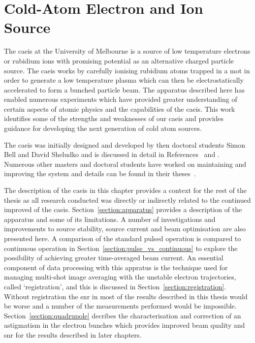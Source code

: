 \chapter{Cold-Atom Electron and Ion Source}\label{chapter:setup}

The \gls{caeis} at the University of Melbourne is a source of low temperature electrons or rubidium ions with promising potential as an alternative charged particle source.
The \gls{caeis} works by carefully ionising rubidium atoms trapped in a \gls{mot} in order to generate a low temperature plasma which can then be electrostatically accelerated to form a bunched particle beam.
The apparatus described here has enabled numerous experiments which have provided greater understanding of certain aspects of atomic physics and the capabilities of the \gls{caeis}.
This work identifies some of the strengths and weaknesses of our \gls{caeis} and provides guidance for developing the next generation of cold atom sources.

The \gls{caeis} was initially designed and developed by then doctoral students Simon Bell and David Sheludko and is discussed in detail in References~\cite{sheludko_shaped_2010} and \cite{bell_cold_2011}.
Numerous other masters and doctoral students have worked on maintaining and improving the system and details can be found in their theses~\cite{saliba_cold_2011,mcculloch_generation_2013,taylor_rydberg_2013,tielen_development_2015,murphy_measurement_2017,speirs_electron_2017}.

The description of the \gls{caeis} in this chapter provides a context for the rest of the thesis as all research conducted was directly or indirectly related to the continued improved of the \gls{caeis}.
Section~\ref{section:apparatus} provides a description of the apparatus and some of its limitations.
A number of investigations and improvements to source stability, source current and beam optimisation are also presented here.
A comparison of the standard pulsed operation is compared to continuous operation in Section~\ref{section:pulse_vs_continuous} to explore the possibility of achieving greater time-averaged beam current.
An essential component of data processing with this appratus is the technique used for managing multi-shot image averaging with the unstable electron trajectories, called `registration', and this is discussed in Section~\ref{section:registration}.
Without registration the \gls{snr} in most of the results described in this thesis would be worse and a number of the measurements performed would be impossible.
Section~\ref{section:quadrupole} decribes the characterisation and correction of an astigmatism in the electron bunches which provides improved beam quality and \gls{snr} for the results described in later chapters.

